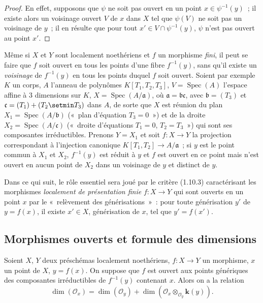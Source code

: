 \begin{proof}
En effet, supposons que $\psi$ ne soit pas ouvert en un point
$x\in\psi^{-1}(y)$~; il existe alors un voisinage ouvert $V$ de $x$ dans $X$ tel
que $\psi(V)$ ne soit pas un voisinage de $y$~; il en résulte que pour tout
$x'\in V\cap\psi^{-1}(y)$, $\psi$ n'est pas ouvert au point $x'$.
\end{proof}

\begin{remark}[14.1.5]
\label{IV.14.1.5-fr}
Même si $X$ et $Y$ sont localement noethériens et $f$ un morphisme \emph{fini},
il peut se faire que $f$ soit ouvert en tous les points d'une fibre $f^{-1}(y)$,
sans qu'il existe un \emph{voisinage} de $f^{-1}(y)$ en tous les points duquel $f$
soit ouvert. Soient par exemple $K$ un corps, $A$ l'anneau de polynômes
$K[T_1,T_2,T_3]$, $V=\operatorname{Spec}(A)$ l'espace affine à 3 dimensions sur
$K$, $X=\operatorname{Spec}(A/\mathfrak a)$, où $\mathfrak a=\mathfrak b\mathfrak c$,
avec $\mathfrak b=(T_3)$ et $\mathfrak c=(T_1)+(T_2\setmin T_3)$ dans $A$, de sorte que
$X$ est réunion du plan $X_1=\operatorname{Spec}(A/\mathfrak b)$ («~plan
d'équation $T_3=0$~») et de la droite $X_2=\operatorname{Spec}(A/\mathfrak c)$
(«~droite d'équations $T_1=0$, $T_2=T_3$~») qui sont ses composantes
irréductibles. Prenons $Y=X_1$ et soit $f:X\to Y$ la projection correspondant à
l'injection canonique $K[T_1,T_2]\to A/\mathfrak a$~; si $y$ est le point commun
à $X_1$ et $X_2$, $f^{-1}(y)$ est réduit à $y$ et $f$ est ouvert en ce point mais
n'est ouvert en aucun point de $X_2$ dans un voisinage de $y$ et distinct de $y$.
\end{remark}

\begin{env}[14.1.6]
\label{IV.14.1.6-fr}
Dans ce qui suit, le rôle essentiel sera joué par le critère (1.10.3)
caractérisant les morphismes \emph{localement de présentation finie} $f:X\to Y$
qui sont ouverts en un point $x$ par le «~relèvement des générisations~»~: pour
toute générisation $y'$ de $y=f(x)$, il existe $x'\in X$, générisation de $x$, tel
que $y'=f(x')$.
\end{env}

\subsection{Morphismes ouverts et formule des dimensions}
\label{subsection:IV.14.2-fr}

\begin{theorem}[14.2.1]
Soient $X$, $Y$ deux préschémas localement noethériens, $f:X\to Y$ un morphisme,
$x$ un point de $X$, $y=f(x)$. On suppose que $f$ est ouvert aux points génériques
des composantes irréductibles de $f^{-1}(y)$ contenant $x$. Alors on a la relation
\begin{equation}
\tag{14.2.1.1}
\label{IV.14.2.1.1-fr}
  \dim(\mathcal O_x)=\dim(\mathcal O_y)+
  \dim(\mathcal O_x\otimes_{\mathcal O_y}\boldsymbol{k}(y)).
\end{equation}
\end{theorem}


